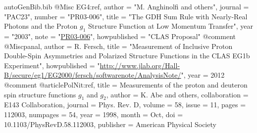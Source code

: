 \begin{filecontents*}{autoGenBib.bib}
@Misc{ EG4:ref,
	author = "{M. Anghinolfi and others}",
	journal = "PAC23",
	number = "PR03-006",
	title = "{The GDH Sum Rule with Nearly-Real Photons and the Proton $g_1$ Structure Function at Low Momentum Transfer}",
	year = "2003",
	note = "\href{http://www.jlab.org/exp_prog/proposals/03/PR03-006.pdf}{PR03-006}",
	howpublished = "CLAS Proposal"
}
@comment %
@Misc{panal,
  author = {R. Fersch},
  title  = "Measurement of Inclusive Proton Double-Spin Asymmetries and Polarized Structure Functions in the CLAS EG1b Experiment",
  howpublished = "\url{http://www.jlab.org/Hall-B/secure/eg1/EG2000/fersch/softwarenote/AnalysisNote/}", 
  year = 2012
}
@comment %
@article{PolNit:ref,
  title = {Measurements of the proton and deuteron spin structure functions ${g}_{1}$ and ${g}_{2}$},
  author = {K. Abe and others},
  collaboration = {E143 Collaboration},
  journal = {Phys. Rev. D},
  volume = {58},
  issue = {11},
  pages = {112003},
  numpages = {54},
  year = {1998},
  month = {Oct},
  doi = {10.1103/PhysRevD.58.112003},
  publisher = {American Physical Society}
}


\end{filecontents*}
